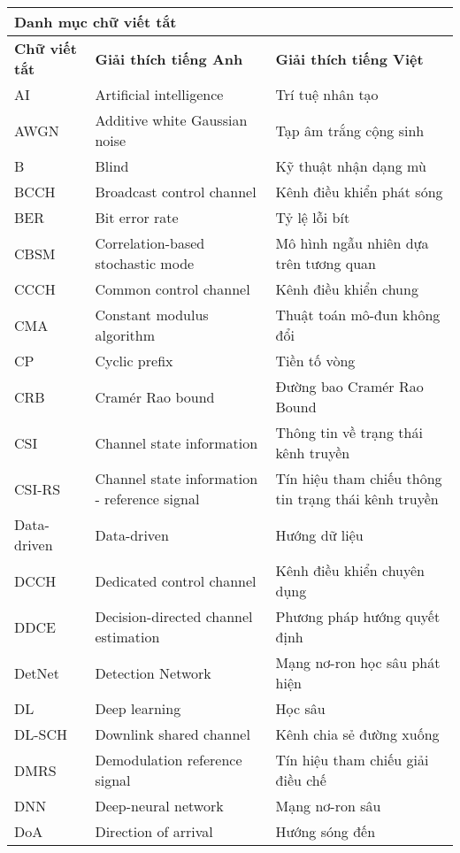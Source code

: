 {\renewcommand{\arraystretch}{1.2}
{\fontsize{12}{13}\selectfont
\begin{longtable}{|p{2.35cm}|>{\raggedright}p{6.2cm}|p{5.75cm}|}
\hline
\multicolumn{3}{|l|}{\textbf{Danh mục chữ viết tắt}} \\ 
\hline
\hline
\textbf{Chữ viết tắt}~ & \textbf{Giải thích tiếng Anh} & \textbf{Giải thích tiếng Việt} \\ 
\hline
AI & Artificial intelligence & Trí tuệ nhân tạo \\ 
\hline
AWGN & Additive white Gaussian noise & Tạp âm trắng cộng sinh \\ 
\hline
B & Blind & Kỹ thuật nhận dạng mù \\ 
\hline
BCCH & Broadcast control channel & Kênh điều khiển phát sóng \\ 
\hline
BER & Bit error rate & Tỷ lệ lỗi bít \\ 
\hline
CBSM & Correlation-based stochastic mode & Mô hình ngẫu nhiên dựa trên tương quan\\
\hline
CCCH & Common control channel & Kênh điều khiển chung \\ 
\hline
CMA & Constant modulus algorithm & Thuật toán mô-đun không đổi \\ 
\hline
CP & Cyclic prefix & Tiền tố vòng \\ 
\hline
CRB & Cramér Rao bound & Đường bao Cramér Rao Bound \\ 
\hline
CSI & Channel state information & Thông tin về trạng thái kênh truyền \\ 
\hline
CSI-RS & Channel state information - reference signal & Tín hiệu tham chiếu thông tin trạng thái kênh truyền \\ 
\hline
Data-driven & Data-driven & Hướng dữ liệu \\ 
\hline
DCCH & Dedicated control channel & Kênh điều khiển chuyên dụng \\ 
\hline
DDCE & Decision-directed channel estimation & Phương pháp hướng quyết định \\ 
\hline
DetNet & Detection Network & Mạng nơ-ron học sâu phát hiện \\ 
\hline
DL & Deep learning & Học sâu \\ 
\hline
DL-SCH & Downlink shared channel & Kênh chia sẻ đường xuống \\ 
\hline
DMRS & Demodulation reference signal & Tín hiệu tham chiếu giải điều chế \\ 
\hline
DNN & Deep-neural network & Mạng nơ-ron sâu \\ 
\hline
DoA & Direction of arrival & Hướng sóng đến \\ 

\end{longtable}}}
